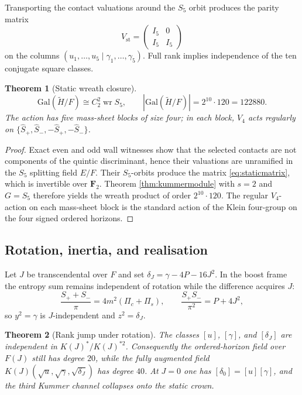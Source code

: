 \documentclass[11pt,a4paper]{article}
\newtheorem{theorem}{Theorem}[section]
\theoremstyle{definition}
\theoremstyle{remark}
\newcommand{\FF}{\mathbf{F}}
\newcommand{\Gal}{\mathrm{Gal}}
\newcommand{\wrp}{\mathop{\mathrm{wr}}}
\begin{document}
Transporting the contact valuations around the \(S_5\) orbit produces the
parity matrix
\begin{equation}
V_{\mathrm{st}}
=
\begin{pmatrix}I_5&0\\ I_5&I_5\end{pmatrix}
\label{eq:staticmatrix}
\end{equation}
on the columns \((u_1,\ldots,u_5\mid\gamma_1,\ldots,\gamma_5)\). Full rank
implies independence of the ten conjugate square classes.

\begin{theorem}[Static wreath closure]
\label{thm:staticwreath}
\[
\Gal(\widetilde H/F)\cong C_2^2\wrp S_5,
\qquad
|\Gal(\widetilde H/F)|=2^{10}\cdot120=122880.
\]
The action has five mass-sheet blocks of size four; in each block, \(V_4\) acts
regularly on \(\{\widehat S_+,\widehat S_-,-\widehat S_+,-\widehat S_-\}\).
\end{theorem}

\begin{proof}
Exact even and odd wall witnesses show that the selected contacts are not
components of the quintic discriminant, hence their valuations are unramified
in the \(S_5\) splitting field \(E/F\). Their \(S_5\)-orbits produce the matrix
\eqref{eq:staticmatrix}, which is invertible over \(\FF_2\). Theorem
\ref{thm:kummermodule} with \(s=2\) and \(G=S_5\) therefore yields the wreath
product of order \(2^{10}\cdot120\). The regular \(V_4\)-action on each
mass-sheet block is the standard action of the Klein four-group on the four
signed ordered horizons.
\end{proof}

\subsection{Rotation, inertia, and realisation}

Let \(J\) be transcendental over \(F\) and set
\(\delta_J=\gamma-4P-16J^2\). In the boost frame the entropy sum remains
independent of rotation while the difference acquires \(J\):
\begin{equation}
\frac{S_++S_-}{\pi}=4m^2(\Pi_c+\Pi_s),
\qquad
\frac{S_+S_-}{\pi^2}=P+4J^2,
\label{eq:rotentropy}
\end{equation}
so \(y^2=\gamma\) is \(J\)-independent and \(z^2=\delta_J\).

\begin{theorem}[Rank jump under rotation]
\label{thm:rankjump}
The classes \([u]\), \([\gamma]\), and \([\delta_J]\) are independent in
\(K(J)^*/K(J)^{*2}\). Consequently the ordered-horizon field over \(F(J)\) still
has degree \(20\), while the fully augmented field
\(K(J)(\sqrt u,\sqrt\gamma,\sqrt{\delta_J})\) has degree \(40\). At \(J=0\) one
has \([\delta_0]=[u][\gamma]\), and the third Kummer channel collapses onto the
static crown.
\end{theorem}
\end{document}
